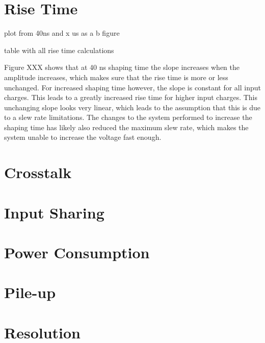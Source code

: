 \documentclass[../main/thesis.tex]{subfiles}
\begin{document}

\section{Rise Time}
\label{ide-risetime}

plot from 40ns and x us as a b figure

table with all rise time calculations

Figure XXX shows that at 40 ns shaping time the slope increases when the amplitude increases, which makes sure that the rise time is more or less unchanged. For increased shaping time however, the slope is constant for all input charges. This leads to a greatly increased rise time for higher input charges. This unchanging slope looks very linear, which leads to the assumption that this is due to a slew rate limitations. The changes to the system performed to increase the shaping time has likely also reduced the maximum slew rate, which makes the system unable to increase the voltage fast enough. 


\section{Crosstalk}
\label{ide-crosstalk}

\section{Input Sharing}
\label{ide-inputshare}

\section{Power Consumption}
\label{ide-power}

\section{Pile-up}
\label{ide-pileup}

\section{Resolution}
\label{ide-resolution}
\end{document}
